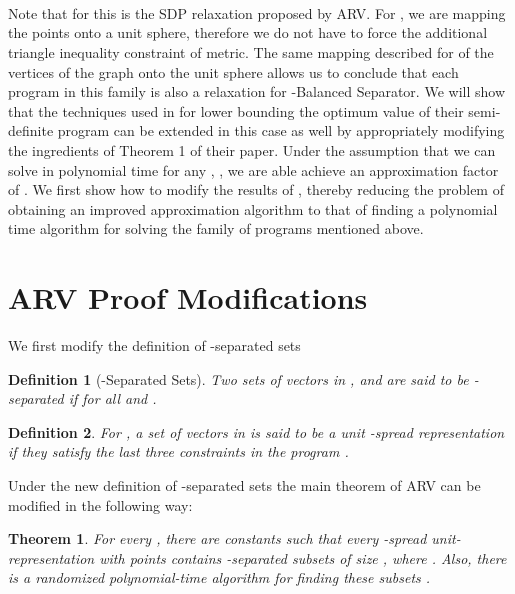 \documentclass [11pt,a4paper]{article}
\newtheorem{theorem}{Theorem}
\newtheorem{definition}{Definition}
\begin{document}
\begin{center}
\\
\\
 \\

\end{center}

Note that for  this is the SDP relaxation proposed by {\sf ARV}. For ,               
we are mapping the points onto a unit sphere, therefore
we do not have to force the additional triangle inequality constraint of  metric. 
The same mapping described for  of the vertices of the graph
onto the unit sphere allows us to conclude that each program in this family 
is also a relaxation for {\sc -Balanced Separator}.
We will show that the techniques used in \cite{ARV} for lower bounding the optimum
value of their semi-definite program can be extended in this case as well by
appropriately modifying the ingredients of Theorem 1 of their paper. Under the assumption that we can solve  in polynomial time
for any , , we are able achieve an approximation factor of . 
We first show how to modify the results of \cite{ARV}, thereby reducing the problem of obtaining 
an improved approximation algorithm to that of finding a polynomial time algorithm for solving 
the family of programs mentioned above.

\section{ARV Proof Modifications}
We first modify the definition of -separated sets 
\begin{definition}[-{\sc Separated Sets}]
Two sets of vectors in ,  and  are said to be -separated if for all  and 
. 
\end{definition}

\begin{definition}
For , a set of vectors in  is said to be a unit -spread  representation if they
satisfy the last three constraints in the program .
\end{definition}

Under the new definition of -separated sets the main theorem of {\sf ARV} can 
be modified in the following way:
\begin{theorem}\label{separated}
For every , there are constants  such that every -spread unit-
representation with  points contains -separated subsets  of size , 
where . Also, there is a randomized polynomial-time
algorithm for finding these subsets .
\end{theorem}
\end{document}
